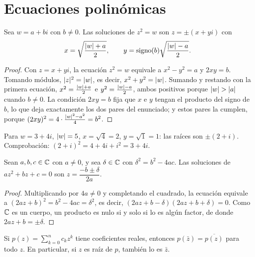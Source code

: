 \section{Ecuaciones polinómicas}

\begin{proposicion}\label{prop:raiz-cuadrada}
Sea $w=a+bi$ con $b\ne0$. Las soluciones de $z^{2}=w$ son $z=\pm(x+yi)$ con
\[
x=\sqrt{\frac{\lvert w\rvert+a}{2}},\qquad y=\operatorname{signo}(b)\sqrt{\frac{\lvert w\rvert-a}{2}} .
\]
\end{proposicion}

\begin{proof}
Con $z=x+yi$, la ecuación $z^{2}=w$ equivale a $x^{2}-y^{2}=a$ y $2xy=b$. Tomando módulos, $\lvert z\rvert^{2}=\lvert w\rvert$, es decir, $x^{2}+y^{2}=\lvert w\rvert$. Sumando y restando con la primera ecuación, $x^{2}=\frac{\lvert w\rvert+a}{2}$ e $y^{2}=\frac{\lvert w\rvert-a}{2}$, ambos positivos porque $\lvert w\rvert>\lvert a\rvert$ cuando $b\ne0$. La condición $2xy=b$ fija que $x$ e $y$ tengan el producto del signo de $b$, lo que deja exactamente los dos pares del enunciado; y estos pares la cumplen, porque $(2xy)^{2}=4\cdot\frac{\lvert w\rvert^{2}-a^{2}}{4}=b^{2}$.
\end{proof}

\begin{ejemplo}\label{ej:raiz}
Para $w=3+4i$, $\lvert w\rvert=5$, $x=\sqrt{4}=2$, $y=\sqrt1=1$: las raíces son $\pm(2+i)$. Comprobación: $(2+i)^{2}=4+4i+i^{2}=3+4i$.
\end{ejemplo}

\begin{proposicion}\label{prop:cuadratica}
Sean $a,b,c\in\mathbb{C}$ con $a\ne0$, y sea $\delta\in\mathbb{C}$ con $\delta^{2}=b^{2}-4ac$. Las soluciones de $az^{2}+bz+c=0$ son $z=\dfrac{-b\pm\delta}{2a}$.
\end{proposicion}

\begin{proof}
Multiplicando por $4a\ne0$ y completando el cuadrado, la ecuación equivale a $(2az+b)^{2}=b^{2}-4ac=\delta^{2}$, es decir, $(2az+b-\delta)(2az+b+\delta)=0$. Como $\mathbb{C}$ es un cuerpo, un producto es nulo si y solo si lo es algún factor, de donde $2az+b=\pm\delta$.
\end{proof}

\begin{proposicion}\label{prop:conjugadas}
Si $p(z)=\sum_{k=0}^{n}c_kz^{k}$ tiene coeficientes reales, entonces $p(\bar z)=\overline{p(z)}$ para todo $z$. En particular, si $z$ es raíz de $p$, también lo es $\bar z$.
\end{proposicion}

